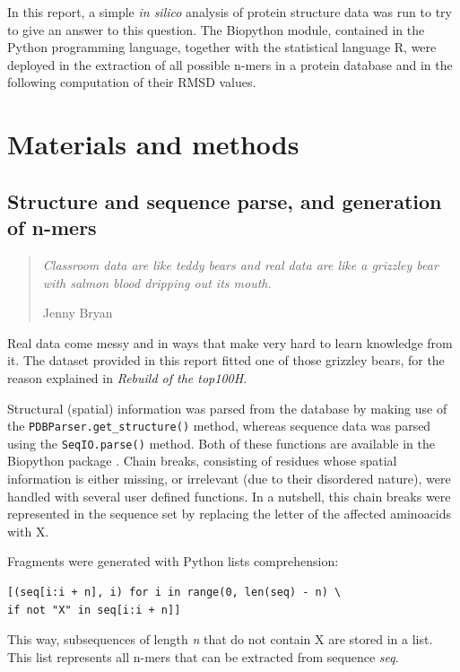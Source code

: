\documentclass[a4paper, 11pt]{article} %
\begin{document}
In this report, a simple \textit{in silico} analysis of protein structure data was run to try to give an answer to this question. The Biopython module, contained in the Python programming language, together with the statistical language R, were deployed in the extraction of all possible n-mers in a protein database and in the following computation of their RMSD values.

\section{Materials and methods}


\subsection{Structure and sequence parse, and generation of n-mers}


\begin{quote}
\textit{Classroom data are like teddy bears and real data are like a 
grizzley bear with salmon blood dripping out its mouth.}

\hfill Jenny Bryan
\end{quote}

Real data come messy and in ways that make very hard to learn knowledge from it. The dataset provided in this report fitted one of those grizzley bears, for the reason explained in \textit{Rebuild of the top100H}.
 
Structural (spatial) information was parsed from the database by making use of the \texttt{PDBParser.get\_structure()} method, whereas sequence data was parsed using the \texttt{SeqIO.parse()}  method. Both of these functions are available in the Biopython package \cite{bio}. Chain breaks, consisting of residues whose spatial information is either missing, or irrelevant (due to their disordered nature), were handled with several user defined functions. In a nutshell, this chain breaks were represented in the sequence set by replacing the letter of the affected aminoacids with X.

Fragments were generated with Python list\textquotesingle s comprehension:

\begin{verbatim}
[(seq[i:i + n], i) for i in range(0, len(seq) - n) \
if not "X" in seq[i:i + n]]
\end{verbatim}

This way, subsequences of length \textit{n} that do not contain X are stored in a list. This list represents all n-mers that can be extracted from sequence \textit{seq}.
\end{document}
